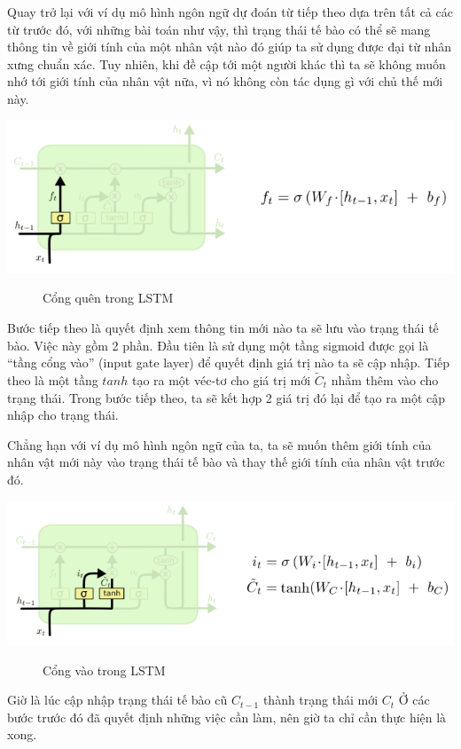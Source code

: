 Quay trở lại với ví dụ mô hình ngôn ngữ dự đoán từ tiếp theo dựa trên tất cả các từ trước đó, với những bài toán như vậy, thì trạng thái tế bào có thể sẽ mang thông tin về giới tính của một nhân vật nào đó giúp ta sử dụng được đại từ nhân xưng chuẩn xác. Tuy nhiên, khi đề cập tới một người khác thì ta sẽ không muốn nhớ tới giới tính của nhân vật nữa, vì nó không còn tác dụng gì với chủ thế mới này.
\begin{center}
    \includegraphics[scale=.5]{image/chapter6/bt1.png}
    \begin{figure}[htp]
    \begin{center}
     
    \end{center}
    \caption{Cổng quên trong LSTM}
    \end{figure}
\end{center}
Bước tiếp theo là quyết định xem thông tin mới nào ta sẽ lưu vào trạng thái tế bào. Việc này gồm 2 phần. Đầu tiên là sử dụng một tầng sigmoid được gọi là “tầng cổng vào” (input gate layer) để quyết định giá trị nào ta sẽ cập nhập. Tiếp theo là một tầng $tanh$ tạo ra một véc-tơ cho giá trị mới $\widetilde{C}_{t}$ nhằm thêm vào cho trạng thái. Trong bước tiếp theo, ta sẽ kết hợp 2 giá trị đó lại để tạo ra một cập nhập cho trạng thái.

Chẳng hạn với ví dụ mô hình ngôn ngữ của ta, ta sẽ muốn thêm giới tính của nhân vật mới này vào trạng thái tế bào và thay thế giới tính của nhân vật trước đó.
\begin{center}
    \includegraphics[scale=.5]{image/chapter6/bt2.png}
    \begin{figure}[htp]
    \begin{center}
     
    \end{center}
    \caption{Cổng vào trong LSTM}
    \end{figure}
\end{center}
Giờ là lúc cập nhập trạng thái tế bào cũ $C_{t-1}$ thành trạng thái mới $C_{t}$ Ở các bước trước đó đã quyết định những việc cần làm, nên giờ ta chỉ cần thực hiện là xong.

